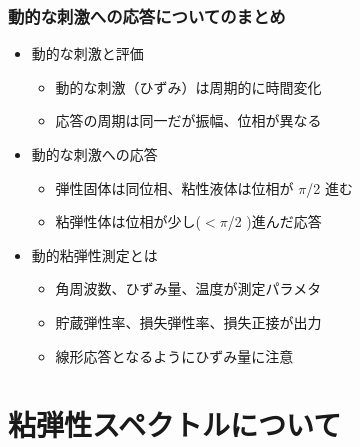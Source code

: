 \documentclass[unicode,12pt]{beamer}%
\begin{document}
\begin{frame}
	\frametitle{動的な刺激への応答についてのまとめ}
        \begin{boxnote}
            \vspace{-3mm}
            \begin{itemize}
                \item 動的な刺激と評価
                    \begin{itemize}
                        \item 動的な刺激（ひずみ）は周期的に時間変化
                        \item 応答の周期は同一だが振幅、位相が異なる
                    \end{itemize} 
                \item 動的な刺激への応答
                    \begin{itemize}
                        \item 弾性固体は同位相、粘性液体は位相が $\pi$/2 進む
                        \item 粘弾性体は位相が少し($<\pi$/2 )進んだ応答
                    \end{itemize} 
                \item 動的粘弾性測定とは
                    \begin{itemize}
                        \item 角周波数、ひずみ量、温度が測定パラメタ
                        \item 貯蔵弾性率、損失弾性率、損失正接が出力
                        \item 線形応答となるようにひずみ量に注意
                    \end{itemize}
            \end{itemize}
        \end{boxnote}
\end{frame}

\section{粘弾性スペクトルについて}
\end{document}
